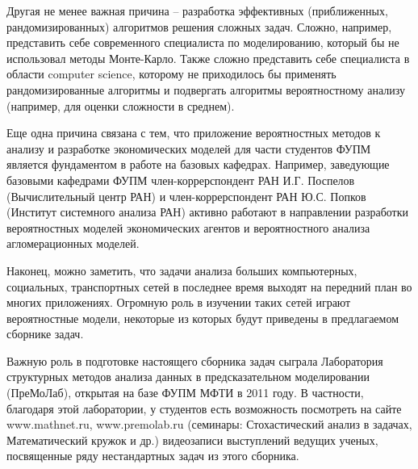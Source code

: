 Другая не менее важная причина -- разработка эффективных (приближенных, рандомизированных) алгоритмов решения сложных задач. 
Сложно, например, представить себе современного специалиста по моделированию, который бы не использовал методы Монте-Карло. Также сложно представить себе специалиста в области computer science, которому не приходилось бы применять рандомизированные алгоритмы и подвергать алгоритмы вероятностному анализу (например, для оценки сложности в среднем). 

Еще одна причина  связана с тем, что приложение вероятностных методов к анализу и разработке экономических моделей для части студентов ФУПМ является фундаментом в работе на базовых кафедрах. Например, заведующие базовыми кафедрами ФУПМ член-коррерспондент РАН И.Г. Поспелов (Вычислительный центр РАН) и  член-коррерспондент РАН Ю.С. Попков (Институт системного анализа РАН) активно работают в направлении разработки вероятностных моделей экономических агентов и вероятностного анализа агломерационных моделей. %

Наконец, можно заметить, что задачи анализа больших компьютерных, социальных, транспортных сетей в последнее время выходят на передний план во многих приложениях. Огромную роль в изучении таких сетей играют вероятностные модели, некоторые из которых будут приведены в предлагаемом сборнике задач. 

Важную роль в подготовке настоящего сборника задач сыграла Лаборатория структурных методов анализа данных в предсказательном моделировании (ПреМоЛаб), открытая на базе ФУПМ МФТИ в 2011 году. В частности, благодаря этой лаборатории, у студентов есть возможность посмотреть на сайте www.mathnet.ru, www.premolab.ru (семинары: Стохастический анализ в задачах, Математический кружок и др.) видеозаписи выступлений ведущих ученых, посвященные ряду нестандартных задач из этого сборника. 

